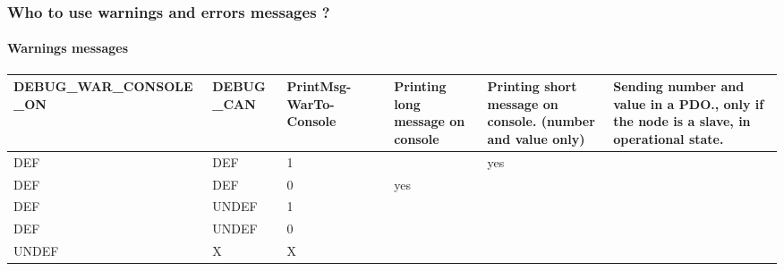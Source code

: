\documentclass[12pt,twoside]{article}
\begin{document}
\subsubsection{Who to use warnings and errors messages ?}
\paragraph{Warnings messages}
\begin{longtable}[c]{|p{0.8476598in}|p{0.7761598in}|p{1.0268599in}|p{-0.026640158in}|p{1.0386599in}|p{1.2247599in}|p{1.1761599in}|}
\hline
{\bfseries
DEBUG\_WAR\_CONSOLE \_ON}
&
{\bfseries
DEBUG \_CAN}
&
{\bfseries
PrintMsg{}-WarTo{}-Console}
&

\bigskip
&
{\bfseries
Printing long message on console }
&
\textbf{Printing short message on console.} (number and value only) 
&
\textbf{Sending number and value in a PDO}., only if the node is a
slave, in operational state. 
\\\hline
\endhead
DEF
&
DEF
&
1
&

\bigskip
&

\bigskip
&
yes
&

\bigskip
\\\hline
DEF
&
DEF
&
0
&

\bigskip
&
yes
&

\bigskip
&

\bigskip
\\\hline
DEF
&
UNDEF
&
1
&

\bigskip
&

\bigskip
&

\bigskip
&

\bigskip
\\\hline
DEF
&
UNDEF
&
0
&

\bigskip
&

\bigskip
&

\bigskip
&

\bigskip
\\\hline
UNDEF
&
X
&
X
&

\bigskip
&

\bigskip
&

\bigskip
&

\bigskip
\\\hline
\end{longtable}

\bigskip
\end{document}
